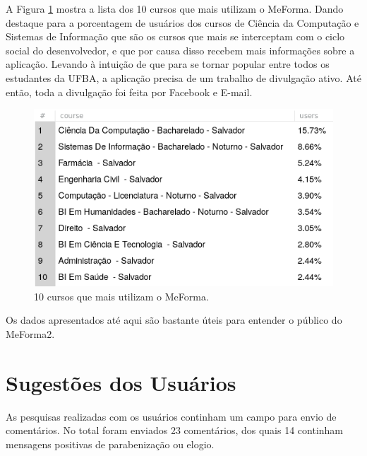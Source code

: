 A Figura \ref{topcourses} mostra a lista dos 10 cursos que mais utilizam o MeForma. Dando destaque para a porcentagem de usuários dos cursos de Ciência da Computação e Sistemas de Informação que são os cursos que mais se interceptam com o ciclo social do desenvolvedor, e que por causa disso recebem mais informações sobre a aplicação. Levando à intuição de que para se tornar popular entre todos os estudantes da UFBA, a aplicação precisa de um trabalho de divulgação ativo. Até então, toda a divulgação foi feita por Facebook e E-mail.

\begin{figure}[H]
	   \centering
	   		\includegraphics[scale=0.75]{pics/c5/8-topcourses.png}
	   \caption{10 cursos que mais utilizam o MeForma.}
	   \label{topcourses}
\end{figure}

Os dados apresentados até aqui são bastante úteis para entender o público do MeForma2.

\section{Sugestões dos Usuários}

As pesquisas realizadas com os usuários continham um campo para envio de comentários. No total foram enviados 23 comentários, dos quais 14 continham mensagens positivas de parabenização ou elogio.




